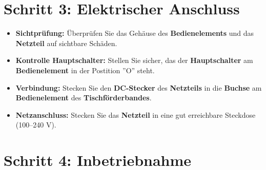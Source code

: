 \section{Schritt 3: Elektrischer Anschluss}

\begin{itemize}
	\item \textbf{Sichtprüfung:} Überprüfen Sie das Gehäuse des \textbf{Bedienelements} und das \textbf{Netzteil} auf sichtbare Schäden.
	
	\item \textbf{Kontrolle Hauptschalter:} Stellen Sie sicher, das der \textbf{Hauptschalter} am \textbf{Bedienelement} in der Postition ''O'' steht. 
	
	\item \textbf{Verbindung:} Stecken Sie den \textbf{DC-Stecker} des \textbf{Netzteils} in die  \textbf{Buchse} am \textbf{Bedienelement} des \textbf{Tischförderbandes}.
	
	\item \textbf{Netzanschluss:} Stecken Sie das \textbf{Netzteil} in eine gut erreichbare Steckdose (100--240 V).
	
\end{itemize}

\section{Schritt 4: Inbetriebnahme}
\label{sec:Inbetriebnahme}


